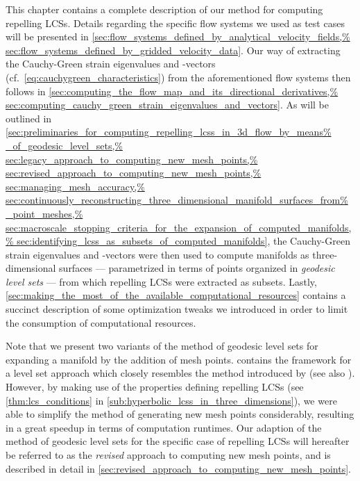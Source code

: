 This chapter contains a complete description of our method for computing
repelling LCSs. Details regarding the specific flow systems we used as test
cases will be presented in
\cref{sec:flow_systems_defined_by_analytical_velocity_fields,%
sec:flow_systems_defined_by_gridded_velocity_data}. Our way of extracting
the Cauchy-Green strain eigenvalues and -vectors (cf.\
\cref{eq:cauchygreen_characteristics}) from the aforementioned flow systems
then follows in
\cref{sec:computing_the_flow_map_and_its_directional_derivatives,%
sec:computing_cauchy_green_strain_eigenvalues_and_vectors}. As will be outlined
in \cref{sec:preliminaries_for_computing_repelling_lcss_in_3d_flow_by_means%
_of_geodesic_level_sets,%
sec:legacy_approach_to_computing_new_mesh_points,%
sec:revised_approach_to_computing_new_mesh_points,%
sec:managing_mesh_accuracy,%
sec:continuously_reconstructing_three_dimensional_manifold_surfaces_from%
_point_meshes,%
sec:macroscale_stopping_criteria_for_the_expansion_of_computed_manifolds,%
sec:identifying_lcss_as_subsets_of_computed_manifolds}, the Cauchy-Green
strain eigenvalues and -vectors were then used to compute manifolds as
three-dimensional surfaces --- parametrized in terms of points organized in
\emph{geodesic level sets} --- from which repelling LCSs were extracted as
subsets. Lastly,
\cref{sec:making_the_most_of_the_available_computational_resources} contains a
succinct description of some optimization tweaks we introduced in order to
limit the consumption of computational resources.

Note that we present two variants of the method of geodesic level sets for
expanding a manifold by the addition of mesh points.
 contains the framework
for a level set approach which closely resembles the method introduced by
\textcite{krauskopf2005survey} (see also \textcite{krauskopf2003computing}).
However, by making use of the properties defining repelling LCSs (see
\cref{thm:lcs_conditions} in \cref{sub:hyperbolic_lcss_in_three_dimensions}),
we were able to simplify the method of generating new mesh points considerably,
resulting in a great speedup in terms of computation runtimes. Our adaption of
the method of geodesic level sets for the specific case of repelling LCSs will
hereafter be referred to as the \emph{revised} approach to computing new mesh
points, and is described in detail in
\cref{sec:revised_approach_to_computing_new_mesh_points}.
%
%
